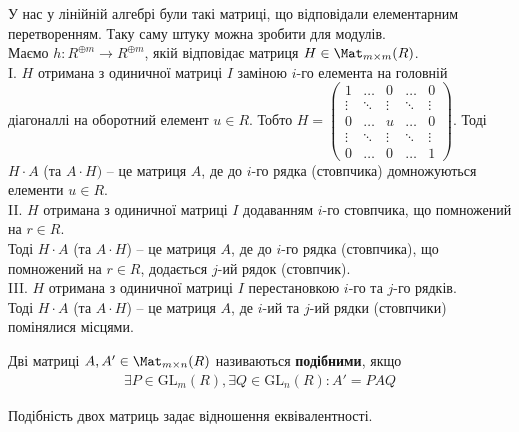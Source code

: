 \documentclass{math_library}
\begin{document}
У нас у лінійній алгебрі були такі матриці, що відповідали елементарним перетворенням. Таку саму штуку можна зробити для модулів.\\
Маємо $h \colon R^{\oplus m} \to R^{\oplus m}$, якій відповідає матриця $H \in \Mat_{m \times m}(R)$.\\
I. $H$ отримана з одиничної матриці $I$ заміною $i$-го елемента на головній діагоналлі на оборотний елемент $u \in R$. Тобто $H = \begin{pmatrix}
1 & \dots & 0 & \dots & 0 \\
\vdots & \ddots & \vdots & \ddots & \vdots \\
0 & \dots & u & \dots & 0 \\
\vdots & \ddots & \vdots & \ddots & \vdots \\
0 & \dots & 0 & \dots & 1
\end{pmatrix}$.
Тоді $H \cdot A$ (та $A \cdot H)$ -- це матриця $A$, де до $i$-го рядка (стовпчика) домножуються елементи $u \in R$.
\bigskip \\
II. $H$ отримана з одиничної матриці $I$ додаванням $i$-го стовпчика, що помножений на $r \in R$.\\
Тоді $H \cdot A$ (та $A \cdot H$) -- це матриця $A$, де до $i$-го рядка (стовпчика), що помножений на $r \in R$, додається $j$-ий рядок (стовпчик).
\bigskip \\
III. $H$ отримана з одиничної матриці $I$ перестановкою $i$-го та $j$-го рядків.\\
Тоді $H \cdot A$ (та $A \cdot H$) -- це матриця $A$, де $i$-ий та $j$-ий рядки (стовпчики) помінялися місцями.

\begin{definition}
Дві матриці $A,A' \in \Mat_{m \times n}(R)$ називаються \textbf{подібними}, якщо
\begin{align*}
\exists P \in \mathrm{GL}_m(R), \exists Q \in \mathrm{GL}_n(R): A' = PAQ
\end{align*}
\end{definition}

\begin{remark}
Подібність двох матриць задає відношення еквівалентності.
\end{remark}
\end{document}
